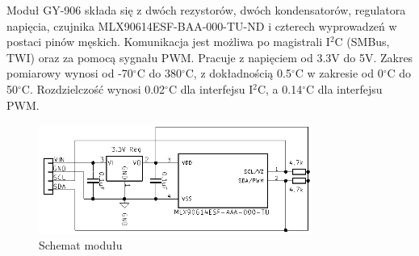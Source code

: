 \documentclass[11pt, a4paper]{article}
\begin{document}
\newline
Moduł GY-906 składa się z dwóch rezystorów, dwóch kondensatorów, regulatora napięcia, czujnika MLX90614ESF-BAA-000-TU-ND i czterech wyprowadzeń w postaci pinów męskich. Komunikacja jest możliwa po magistrali I$^{2}$C (SMBus, TWI) oraz za pomocą sygnału PWM. Pracuje z napięciem od 3.3V do 5V. Zakres pomiarowy wynosi od -70$^{\circ}$C do 380$^{\circ}$C, z dokładnością 0.5$^{\circ}$C w zakresie od 0$^{\circ}$C do 50$^{\circ}$C. Rozdzielczość wynosi 0.02$^{\circ}$C dla interfejsu I$^{2}$C, a 0.14$^{\circ}$C dla interfejsu PWM.
\vspace{0.5cm}
\begin{figure}[h!]
    \centering
    \includegraphics[width=0.8\textwidth]{fig/GY-906/zasada_dzialania/schematt.png}
    \caption{Schemat modułu}
    \label{fig:my_label}
\end{figure}

\newpage
\end{document}
